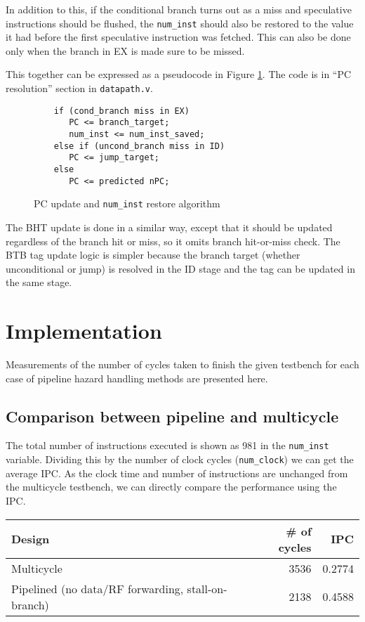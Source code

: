 \documentclass[12pt]{article}
\begin{document}
In addition to this, if the conditional branch turns out as a miss and
speculative instructions should be flushed, the \verb|num_inst| should
also be restored to the value it had before the first speculative
instruction was fetched.  This can also be done only when the branch
in EX is made sure to be missed.

This together can be expressed as a pseudocode in Figure
\ref{fig:pseudocode}.  The code is in ``PC resolution'' section in
\verb|datapath.v|.

\begin{figure}[ht]
  \centering
  \begin{BVerbatim}
    if (cond_branch miss in EX)
       PC <= branch_target;
       num_inst <= num_inst_saved;
    else if (uncond_branch miss in ID)
       PC <= jump_target;
    else
       PC <= predicted nPC;
  \end{BVerbatim}
  \caption{PC update and \texttt{num\_inst} restore algorithm}
  \label{fig:pseudocode}
\end{figure}

The BHT update is done in a similar way, except that it should be
updated regardless of the branch hit or miss, so it omits branch
hit-or-miss check.  The BTB tag update logic is simpler because the
branch target (whether unconditional or jump) is resolved in the ID
stage and the tag can be updated in the same stage.

\section{Implementation}
Measurements of the number of cycles taken to finish the given
testbench for each case of pipeline hazard handling methods are
presented here.

\subsection{Comparison between pipeline and multicycle}

The total number of instructions executed is shown as 981 in the
\verb|num_inst| variable.  Dividing this by the number of clock cycles
(\verb|num_clock|) we can get the average IPC.  As the clock time and
number of instructions are unchanged from the multicycle testbench, we
can directly compare the performance using the IPC.

\begin{table}[ht]
  \centering
  \begin{tabular}{@{}lrr@{}} \toprule
    Design & \# of cycles & IPC \\ \midrule
    Multicycle & 3536 & 0.2774 \\
    Pipelined (no data/RF forwarding, stall-on-branch) & 2138 & 0.4588 \\ \bottomrule
  \end{tabular}
\end{table}
\end{document}
